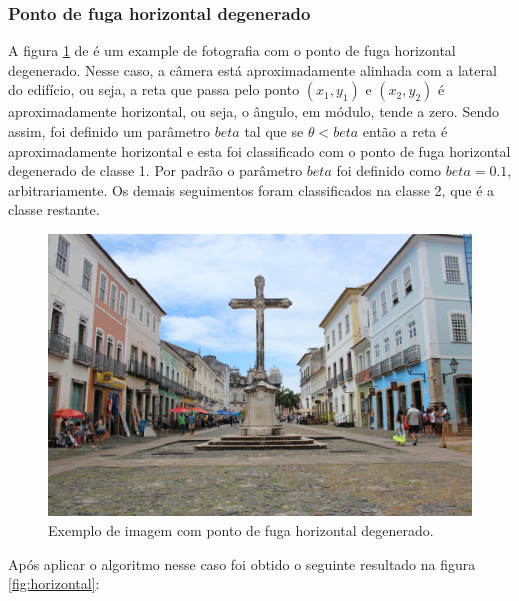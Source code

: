 \documentclass[12pt]{article}
\begin{document}
\subsubsection{Ponto de fuga horizontal degenerado}

A figura \ref{fig:salvador} de \cite{salvador} é um example de fotografia com o ponto de fuga horizontal degenerado. Nesse caso, a câmera está aproximadamente alinhada com a lateral do edifício, ou seja, a reta que passa pelo ponto $(x_1,y_1)$ e $(x_2,y_2)$ é aproximadamente horizontal, ou seja, o ângulo, em módulo, tende a zero. Sendo assim, foi definido um parâmetro $beta$ tal que se $\theta < beta$ então a reta é aproximadamente horizontal e esta foi classificado com o ponto de fuga horizontal degenerado de classe 1. Por padrão o parâmetro $beta$ foi definido como $beta=0.1$, arbitrariamente. Os demais seguimentos foram classificados na classe 2, que é a classe restante.

\begin{figure}[H]
\centering
\includegraphics[scale=0.20]{salvador.jpg}
\caption{Exemplo de imagem com ponto de fuga horizontal degenerado.}
\label{fig:salvador}
\end{figure}

Após aplicar o algoritmo nesse caso foi obtido o seguinte resultado na figura \ref{fig:horizontal}:
\end{document}
